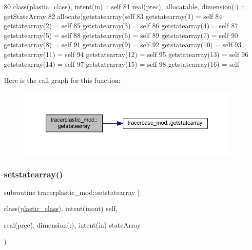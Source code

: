 \begin{DoxyCode}
80     \textcolor{keywordtype}{class}(plastic\_class), \textcolor{keywordtype}{intent(in)} :: self
81     \textcolor{keywordtype}{real(prec)}, \textcolor{keywordtype}{allocatable}, \textcolor{keywordtype}{dimension(:)} :: getStateArray
82     \textcolor{keyword}{allocate}(getstatearray(self%
83     getstatearray(1) = self%
84     getstatearray(2) = self%
85     getstatearray(3) = self%
86     getstatearray(4) = self%
87     getstatearray(5) = self%
88     getstatearray(6) = self%
89     getstatearray(7) = self%
90     getstatearray(8) = self%
91     getstatearray(9) = self%
92     getstatearray(10) = self%
93     getstatearray(11) = self%
94     getstatearray(12) = self%
95     getstatearray(13) = self%
96     getstatearray(14) = self%
97     getstatearray(15) = self%
98     getstatearray(16) = self%
\end{DoxyCode}
Here is the call graph for this function\+:\nopagebreak
\begin{figure}[H]
\begin{center}
\leavevmode
\includegraphics[width=350pt]{namespacetracerplastic__mod_aa8cdd2196261b216dd6cdd5b7ef2fe90_cgraph}
\end{center}
\end{figure}
\mbox{\label{namespacetracerplastic__mod_a5e5bd350455400938950d2129c1f4980}} 
\subsubsection{\texorpdfstring{setstatearray()}{setstatearray()}}
{\footnotesize\ttfamily subroutine tracerplastic\+\_\+mod\+::setstatearray (\begin{DoxyParamCaption}\item[{class(\mbox{\hyperlink{structtracerplastic__mod_1_1plastic__class}{plastic\+\_\+class}}), intent(inout)}]{self,  }\item[{real(prec), dimension(\+:), intent(in)}]{state\+Array }\end{DoxyParamCaption})\hspace{0.3cm}{\ttfamily [private]}}



